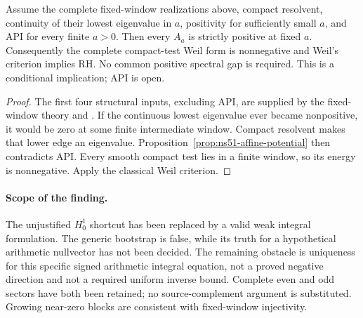 \begin{proposition}
\label{prop:ns51-sign-continuation}
Assume the complete fixed-window realizations above, compact resolvent,
continuity of their lowest eigenvalue in $a$, positivity for sufficiently
small $a$, and API for every finite $a>0$. Then every $A_a$ is strictly
positive at fixed $a$. Consequently the complete compact-test Weil
form is nonnegative and Weil's criterion implies RH. No common positive
spectral gap is required. This is a conditional implication; API is open.
\end{proposition}
\begin{proof}
The first four structural inputs, excluding API, are supplied by the
fixed-window theory and \cite[Theorems 1.3--1.4]{Suzuki2026}.
If the continuous lowest eigenvalue ever became nonpositive, it would
be zero at some finite intermediate window. Compact resolvent makes
that lower edge an eigenvalue. Proposition~\ref{prop:ns51-affine-potential}
then contradicts API. Every smooth compact test lies in a finite window,
so its energy is nonnegative. Apply the classical Weil criterion.
\end{proof}

\paragraph{Scope of the finding.}
The unjustified $H_0^1$ shortcut has been replaced by a valid weak
integral formulation. The generic bootstrap is false, while its truth
for a hypothetical arithmetic nullvector has not been decided. The
remaining obstacle is uniqueness for this specific signed arithmetic
integral equation, not a proved negative direction and not a required
uniform inverse bound. Complete even and odd sectors have both been
retained; no source-complement argument is substituted. Growing
near-zero blocks are consistent with fixed-window injectivity.
